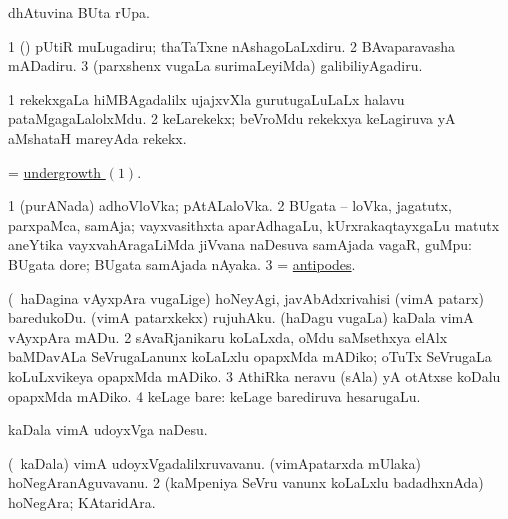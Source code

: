 \bentry
{} 
\gl{\kirx}
\expl{}
\bmng
  dhAtuvina BUta rUpa. 
\emng
\eentry

\bentry
{} 
\gl{\sakirx}
\expl{}
\bmng
\bnum
\num{1} (\hA) pUtiR muLugadiru; thaTaTxne nAshagoLaLxdiru. 
\num{2} BAvaparavasha mADadiru. 
\num{3} (parxshenx \mo vugaLa surimaLeyiMda) galibiliyAgadiru. 
\enum
\emng
\eentry

\bentry
{} 
\gl{\nA}
\expl{}
\bmng
\bnum
\num{1} rekekxgaLa hiMBAgadalilx ujajxvXla gurutugaLuLaLx halavu pataMgagaLalolxMdu. 
\num{2} keLarekekx; beVroMdu rekekxya keLagiruva yA aMshataH mareyAda rekekx. 
\enum
\emng
\eentry

\bentry
{} 
\gl{\nA}
\expl{}
\bmng
 = \hyperlink{undergrowth}{undergrowth \((1)\)}. 
\emng
\eentry

\bentry
{} 
\gl{\nA}
\expl{}
\bmng
\bnum
\num{1} (purANada) adhoVloVka; pAtALaloVka. 
\num{2} BUgata -- loVka, jagatutx, parxpaMca, samAja; vayxvasithxta aparAdhagaLu, kUrxrakaqtayxgaLu matutx aneYtika vayxvahAragaLiMda jiVvana naDesuva samAjada vagaR, guMpu:  BUgata dore; BUgata samAjada nAyaka. 
\num{3} = \hyperref{kandict_a.pdf}{A}{antipodes}{antipodes}. 
\enum
\emng
\eentry

\bentry
{} 
\gl{\kirx}
\bmng
\emng

\noindent
\gl{\sakirx}
\bmng
\bnum
{} (\kanmu\ haDagina vAyxpAra \mo vugaLige) 
\banum
{} hoNeyAgi, javAbAdxrivahisi (vimA patarx) baredukoDu. 
 (vimA patarxkekx) rujuhAku. 
 (haDagu \mo vugaLa) kaDala vimA vAyxpAra mADu. 
\eanum
\numie
\num{2} sAvaRjanikaru koLaLxda, oMdu saMsethxya elAlx baMDavALa SeVrugaLanunx koLaLxlu opapxMda mADiko; oTuTx SeVrugaLa koLuLxvikeya opapxMda mADiko. 
\num{3} AthiRka neravu (sAla) yA otAtxse koDalu opapxMda mADiko. 
\num{4} keLage bare:  keLage barediruva hesarugaLu. 
\enum
\emng

\noindent
\gl{\akirx}
\expl{}
\bmng
kaDala vimA udoyxVga naDesu. 
\emng
\eentry

\bentry
{} 
\gl{\nA}
\expl{}
\bmng
\bnum
{} 
\banum
{} (\kanmu\ kaDala) vimA udoyxVgadalilxruvavanu. 
 (vimApatarxda mUlaka) hoNegAranAguvavanu. 
\eanum
\numie
\num{2} (kaMpeniya SeVru \mo vanunx koLaLxlu badadhxnAda) hoNegAra; KAtaridAra. 
\enum
\emng
\eentry

